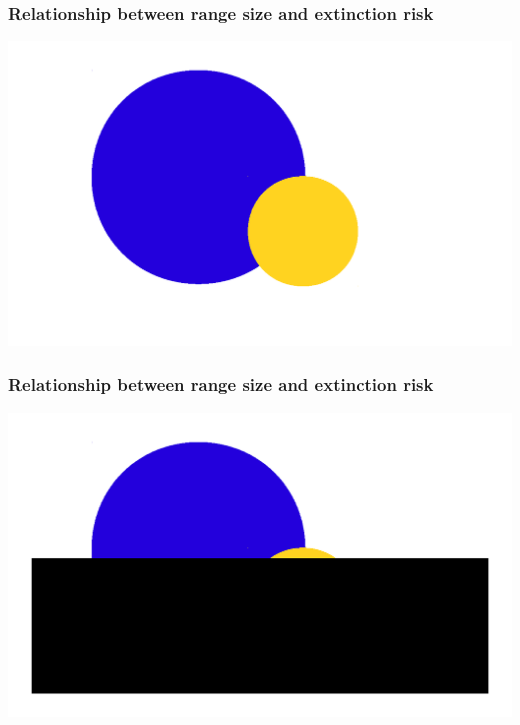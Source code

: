 \documentclass{beamer}
\begin{document}
\begin{frame}
  \frametitle{Relationship between range size and extinction risk}
  \begin{center}
    \includegraphics[width = \textwidth,height = 0.8\textheight,keepaspectratio = true]{figure/geo_range_1}
  \end{center}
\end{frame}

\begin{frame}
  \frametitle{Relationship between range size and extinction risk}
  \begin{center}
    \includegraphics[width = \textwidth,height = 0.8\textheight,keepaspectratio = true]{figure/geo_range_2}
  \end{center}
\end{frame}
\end{document}
